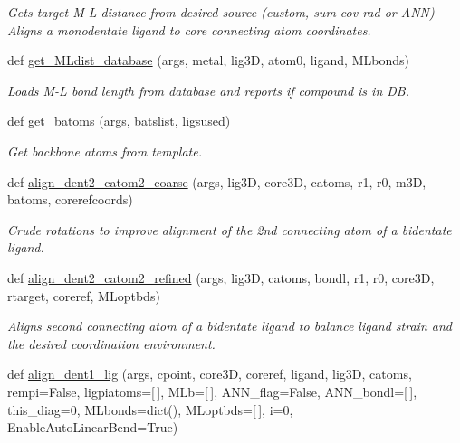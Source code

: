 \begin{DoxyCompactItemize}
\begin{DoxyCompactList}\small\item\em Gets target M-\/L distance from desired source (custom, sum cov rad or A\+NN) Aligns a monodentate ligand to core connecting atom coordinates. \end{DoxyCompactList}\item 
def \hyperlink{namespacemolSimplify_1_1Scripts_1_1structgen_a465ae4df8d02b58855091e9f98d2c2a9}{get\+\_\+\+M\+Ldist\+\_\+database} (args, metal, lig3D, atom0, ligand, M\+Lbonds)
\begin{DoxyCompactList}\small\item\em Loads M-\/L bond length from database and reports if compound is in DB. \end{DoxyCompactList}\item 
def \hyperlink{namespacemolSimplify_1_1Scripts_1_1structgen_ad738c67fce6cc4b42b66d20282aa0b17}{get\+\_\+batoms} (args, batslist, ligsused)
\begin{DoxyCompactList}\small\item\em Get backbone atoms from template. \end{DoxyCompactList}\item 
def \hyperlink{namespacemolSimplify_1_1Scripts_1_1structgen_ae637242b085f9768b5ae20a2204f6bc6}{align\+\_\+dent2\+\_\+catom2\+\_\+coarse} (args, lig3D, core3D, catoms, r1, r0, m3D, batoms, corerefcoords)
\begin{DoxyCompactList}\small\item\em Crude rotations to improve alignment of the 2nd connecting atom of a bidentate ligand. \end{DoxyCompactList}\item 
def \hyperlink{namespacemolSimplify_1_1Scripts_1_1structgen_a03a7d014d089398102d9c1b9e939f133}{align\+\_\+dent2\+\_\+catom2\+\_\+refined} (args, lig3D, catoms, bondl, r1, r0, core3D, rtarget, coreref, M\+Loptbds)
\begin{DoxyCompactList}\small\item\em Aligns second connecting atom of a bidentate ligand to balance ligand strain and the desired coordination environment. \end{DoxyCompactList}\item 
def \hyperlink{namespacemolSimplify_1_1Scripts_1_1structgen_a91f6c3dc244887d2e71cdfa122ee7993}{align\+\_\+dent1\+\_\+lig} (args, cpoint, core3D, coreref, ligand, lig3D, catoms, rempi=False, ligpiatoms=\mbox{[}$\,$\mbox{]}, M\+Lb=\mbox{[}$\,$\mbox{]}, A\+N\+N\+\_\+flag=False, A\+N\+N\+\_\+bondl=\mbox{[}$\,$\mbox{]}, this\+\_\+diag=0, M\+Lbonds=dict(), M\+Loptbds=\mbox{[}$\,$\mbox{]}, i=0, Enable\+Auto\+Linear\+Bend=True)

\end{DoxyCompactItemize}
